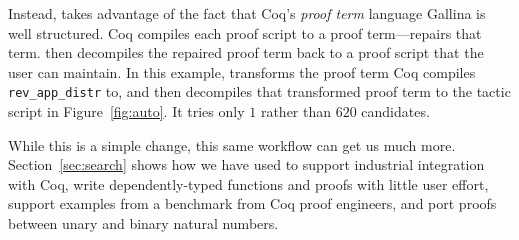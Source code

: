 Instead, \toolname takes advantage of the fact that Coq's \textit{proof term} language Gallina is well structured.
Coq compiles each proof script to a proof term---\toolname repairs that term.
\toolname then decompiles the repaired proof term back to a proof script that the user can maintain.
In this example, \toolname transforms the proof term Coq compiles \lstinline{rev_app_distr} to,
and then decompiles that transformed proof term to the tactic script in Figure~\ref{fig:auto}.
It tries only $1$ rather than $620$ candidates. 

While this is a simple change, this same workflow can get us much more.
Section~\ref{sec:search} shows how we have used \toolname to support industrial integration with Coq,
write dependently-typed functions and proofs with little user effort,
support examples from a benchmark from Coq proof engineers,
and port proofs between unary and binary natural numbers.




